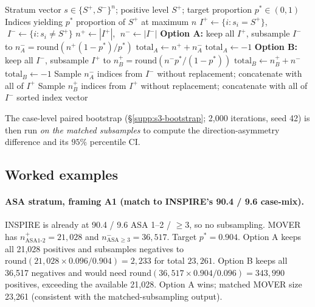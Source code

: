 \documentclass[11pt,a4paper]{article}
\begin{document}
\begin{algorithm}[H]
\caption{Two-stratum maximum-$n$ matched subsampling.}
\label{alg:matched-indices}
\begin{algorithmic}[1]
\Require Stratum vector $s \in \{S^+, S^-\}^n$; positive level $S^+$;
target proportion $p^* \in (0, 1)$
\Ensure Indices yielding $p^*$ proportion of $S^+$ at maximum $n$
\State $I^+ \gets \{i : s_i = S^+\}$, $\;I^- \gets \{i : s_i \ne S^+\}$
\State $n^+ \gets |I^+|$, $\;n^- \gets |I^-|$
\State \textbf{Option A:} keep all $I^+$, subsample $I^-$ to $n^-_A = \mathrm{round}(n^+ (1 - p^*)/p^*)$
 
  \State $\mathrm{total}_A \gets n^+ + n^-_A$
\Else
  \State $\mathrm{total}_A \gets -1$
\EndIf
\State \textbf{Option B:} keep all $I^-$, subsample $I^+$ to $n^+_B = \mathrm{round}(n^- p^*/(1 - p^*))$
  \State $\mathrm{total}_B \gets n^+_B + n^-$
\Else
  \State $\mathrm{total}_B \gets -1$
\EndIf
{}
  \State Sample $n^-_A$ indices from $I^-$ without replacement; concatenate with all of $I^+$
\Else
  \State Sample $n^+_B$ indices from $I^+$ without replacement; concatenate with all of $I^-$
\EndIf
\State \Return sorted index vector
\end{algorithmic}
\end{algorithm}

The case-level paired bootstrap (\S\ref{supp:s3-bootstrap}; 2{,}000 iterations,
seed 42) is then run \emph{on the matched subsamples} to compute the
direction-asymmetry difference and its $95\%$ percentile CI.

\subsection{Worked examples}\label{supp:s4-examples}

\paragraph{ASA stratum, framing A1 (match to INSPIRE's 90.4 / 9.6 case-mix).}
INSPIRE is already at 90.4 / 9.6 ASA 1--2 / $\geq 3$, so no subsampling.
MOVER has $n^+_{\text{ASA1-2}} = 21{,}028$ and $n^-_{\text{ASA}\ge 3} = 36{,}517$.
Target $p^* = 0.904$. Option A keeps all 21{,}028 positives and subsamples
negatives to $\mathrm{round}(21{,}028 \times 0.096/0.904) = 2{,}233$ for total
$23{,}261$. Option B keeps all 36{,}517 negatives and would need
$\mathrm{round}(36{,}517 \times 0.904/0.096) = 343{,}990$ positives, exceeding
the available 21{,}028. Option A wins; matched MOVER size 23{,}261
(consistent with the matched-subsampling output).
\end{document}
